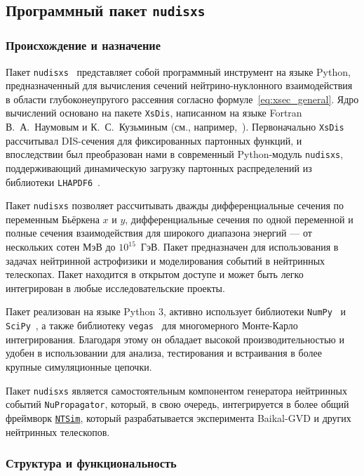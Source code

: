 \subsection{Программный пакет \texttt{nudisxs}}

\subsubsection{Происхождение и назначение}

Пакет \texttt{nudisxs}~\cite{nudisxs2022} представляет собой программный инструмент на языке Python, предназначенный для вычисления сечений нейтрино-нуклонного взаимодействия в области глубоконеупругого рассеяния согласно формуле~\eqref{eq:xsec_general}. Ядро вычислений основано на пакете \texttt{XsDis}, написанном на языке Fortran В.~А.~Наумовым и К.~С.~Кузьминым (см., например,~\cite{nudisxs2022}). Первоначально \texttt{XsDis} рассчитывал DIS-сечения для фиксированных партонных функций, и впоследствии был преобразован нами в современный Python-модуль \texttt{nudisxs}, поддерживающий динамическую загрузку партонных распределений из библиотеки \texttt{LHAPDF6}~\cite{aartsenLHAPDF2020}.

Пакет \texttt{nudisxs} позволяет рассчитывать дважды дифференциальные сечения по переменным Бьёркена $x$ и $y$, дифференциальные сечения по одной переменной и полные сечения взаимодействия для широкого диапазона энергий — от нескольких сотен МэВ до $10^{15}$~ГэВ. Пакет предназначен для использования в задачах нейтринной астрофизики и моделирования событий в нейтринных телескопах. Пакет находится в открытом доступе и может быть легко интегрирован в любые исследовательские проекты.


Пакет реализован на языке Python 3, активно использует библиотеки \texttt{NumPy}~\cite{2020NumPy-Array} и \texttt{SciPy}~\cite{2020SciPy-NMeth}, а также библиотеку \texttt{vegas}~\cite{lepageVegas2021} для многомерного Монте-Карло интегрирования. Благодаря этому он обладает высокой производительностью и удобен в использовании для анализа, тестирования и встраивания в более крупные симуляционные цепочки.

Пакет \texttt{nudisxs} является самостоятельным компонентом генератора нейтринных событий \texttt{NuPropagator}, который, в свою очередь, интегрируется в более общий фреймворк \href{https://pypi.org/project/ntsim/}{\texttt{NTSim}}, который разрабатывается эксперимента Baikal-GVD и других нейтринных телескопов.

\subsubsection{Структура и функциональность}

